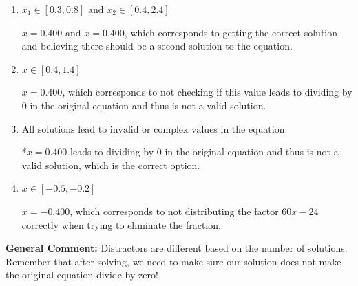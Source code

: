 \documentclass{extbook}[14pt]
\begin{document}
\begin{enumerate}
{\begin{enumerate}[label=\Alph*.]
$x = -0.400 \text{ and } x = 0.400$, which corresponds to getting the correct solution and believing there should be a second solution to the equation.
\item \( x_1 \in [0.3, 0.8] \text{ and } x_2 \in [0.4,2.4] \)

$x = 0.400 \text{ and } x = 0.400$, which corresponds to getting the correct solution and believing there should be a second solution to the equation.
\item \( x \in [0.4,1.4] \)

$x = 0.400$, which corresponds to not checking if this value leads to dividing by 0 in the original equation and thus is not a valid solution.
\item \( \text{All solutions lead to invalid or complex values in the equation.} \)

*$x = 0.400$ leads to dividing by 0 in the original equation and thus is not a valid solution, which is the correct option.
\item \( x \in [-0.5,-0.2] \)

$x = -0.400$, which corresponds to not distributing the factor $60x -24$ correctly when trying to eliminate the fraction.
\end{enumerate}

\textbf{General Comment:} Distractors are different based on the number of solutions. Remember that after solving, we need to make sure our solution does not make the original equation divide by zero!
}
\end{enumerate}
\end{document}
